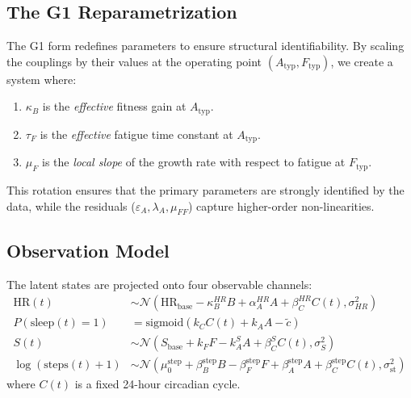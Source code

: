 \subsection{The G1 Reparametrization}

The G1 form redefines parameters to ensure structural identifiability. By scaling the couplings by their values at the operating point $(A_{\mathrm{typ}}, F_{\mathrm{typ}})$, we create a system where:
\begin{enumerate}
    \item $\kappa_B$ is the \textit{effective} fitness gain at $A_{\mathrm{typ}}$.
    \item $\tau_F$ is the \textit{effective} fatigue time constant at $A_{\mathrm{typ}}$.
    \item $\mu_F$ is the \textit{local slope} of the growth rate with respect to fatigue at $F_{\mathrm{typ}}$.
\end{enumerate}
This rotation ensures that the primary parameters are strongly identified by the data, while the residuals ($\varepsilon_A, \lambda_A, \mu_{FF}$) capture higher-order non-linearities.

\subsection{Observation Model}

The latent states are projected onto four observable channels:
\begin{align*}
  \mathrm{HR}(t) &\sim \mathcal{N}(\text{HR}_{\text{base}} - \kappa_B^{HR}B + \alpha_A^{HR}A + \beta_C^{HR}C(t), \sigma_{HR}^2) \\
  P(\text{sleep}(t)=1) &= \text{sigmoid}(k_C C(t) + k_A A - \tilde{c}) \\
  S(t) &\sim \mathcal{N}(S_{\text{base}} + k_F F - k_A^S A + \beta_C^S C(t), \sigma_S^2) \\
  \log(\text{steps}(t)+1) &\sim \mathcal{N}(\mu_0^{\text{step}} + \beta_B^{\text{step}}B - \beta_F^{\text{step}}F + \beta_A^{\text{step}}A + \beta_C^{\text{step}}C(t), \sigma_{\text{st}}^2)
\end{align*}
where $C(t)$ is a fixed 24-hour circadian cycle.
